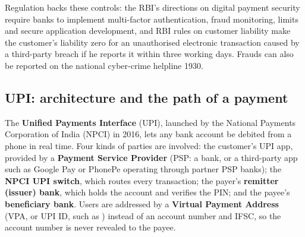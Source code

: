 Regulation backs these controls: the RBI's directions on digital payment security require banks to implement multi-factor authentication, fraud monitoring, limits and secure application development, and RBI rules on customer liability make the customer's liability zero for an unauthorised electronic transaction caused by a third-party breach if he reports it within three working days. Frauds can also be reported on the national cyber-crime helpline 1930.

\subsection{UPI: architecture and the path of a payment \hot\new}

The \textbf{Unified Payments Interface} (UPI), launched by the National Payments Corporation of India (NPCI) in 2016, lets any bank account be debited from a phone in real time. Four kinds of parties are involved: the customer's UPI app, provided by a \textbf{Payment Service Provider} (PSP: a bank, or a third-party app such as Google Pay or PhonePe operating through partner PSP banks); the \textbf{NPCI UPI switch}, which routes every transaction; the payer's \textbf{remitter (issuer) bank}, which holds the account and verifies the PIN; and the payee's \textbf{beneficiary bank}. Users are addressed by a \textbf{Virtual Payment Address} (VPA, or UPI ID, such as ) instead of an account number and IFSC, so the account number is never revealed to the payee.

\begin{center}
\end{center}

